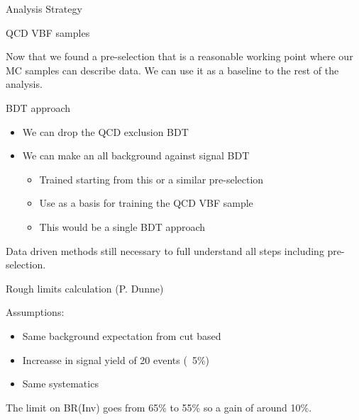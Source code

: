 \documentclass[8pt]{beamer}
\begin{document}
\begin{frame}{Analysis Strategy}

\begin{block}{QCD VBF samples}
 
Now that we found a pre-selection that is a reasonable working point where our MC samples can describe data. We can use it as a baseline to the rest of the analysis.

\end{block}

\begin{block}{BDT approach}
 
\begin{itemize}
 \item We can drop the QCD exclusion BDT
 \item We can make an all background against signal BDT 
 \begin{itemize}
   \item Trained starting from this or a similar pre-selection
   \item Use as a basis for training the QCD VBF sample
   \item This would be a single BDT approach
  \end{itemize}
\end{itemize}
 
Data driven methods still necessary to full understand all steps including pre-selection. 
 
\end{block}
 
\end{frame}

{

}

{

}

{

}

% 

{

}

\begin{frame}{Rough limits calculation \hfill(P. Dunne)}
 
\begin{block}{Assumptions:}
 
\begin{itemize}
  \item Same background expectation from cut based
  \item Increasse in signal yield of 20 events (~5\%)
  \item Same systematics
\end{itemize}

\end{block}
 
The limit on BR(Inv) goes from 65\% to 55\% so a gain of around 10\%.
 
\end{frame}
\end{document}
